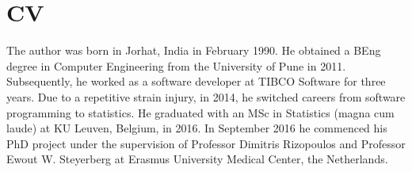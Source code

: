 \section{CV}
The author was born in Jorhat, India in February 1990. He obtained a BEng degree in Computer Engineering from the University of Pune in 2011. Subsequently, he worked as a software developer at TIBCO Software for three years. Due to a repetitive strain injury, in 2014, he switched careers from software programming to statistics. He graduated with an MSc in Statistics (magna cum laude) at KU Leuven, Belgium, in 2016. In September 2016 he commenced his PhD project under the supervision of Professor Dimitris Rizopoulos and Professor Ewout W. Steyerberg at Erasmus University Medical Center, the Netherlands.